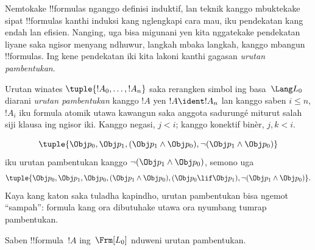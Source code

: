 \documentclass[../../../include/open-logic-section]{subfiles}
\begin{document}


Nemtokake !!{formula}s nganggo definisi induktif, lan teknik kanggo
mbuktekake sipat !!{formula}s kanthi induksi kang nglengkapi cara mau,
iku pendekatan kang endah lan efisien. Nanging, uga bisa migunani yen
kita nggatekake pendekatan liyane saka ngisor menyang ndhuwur, langkah
mbaka langkah, kanggo mbangun !!{formula}s. Ing kene pendekatan iki kita
lakoni kanthi gagasan \emph{urutan pambentukan}.

\begin{defn}
Urutan winates $\tuple{!A_0,\dotsc,!A_n}$ saka rerangken simbol ing
basa~$\Lang L_0$ diarani \emph{urutan pambentukan} kanggo $!A$ yen
$!A \ident !A_n$ lan kanggo saben $i \leq n$, $!A_i$ iku formula
atomik utawa kawangun saka anggota sadurungé miturut salah siji
klausa ing ngisor iki. Kanggo negasi, $j<i$; kanggo konektif binèr, $j,k<i$.
\begin{enumerate}
\end{enumerate}
\end{defn}

\begin{ex}
\[
\tuple{
    \Obj p_0,
    \Obj p_1,
    (\Obj p_1 \land \Obj p_0),
    \lnot (\Obj p_1 \land \Obj p_0)
}
\]
iku urutan pambentukan kanggo
$\lnot (\Obj p_1 \land \Obj p_0)$, semono uga
\[
\tuple{
    \Obj p_0,
    \Obj p_1,
    \Obj p_0,
    (\Obj p_1 \land \Obj p_0),
    (\Obj p_0 \lif \Obj p_1),
    \lnot (\Obj p_1 \land \Obj p_0)
}.
\]
%
Kaya kang katon saka tuladha kapindho, urutan pambentukan bisa ngemot
``sampah'': formula kang ora dibutuhake utawa ora nyumbang tumrap
pambentukan.
\end{ex}

\begin{prop}
Saben !!{formula}~$!A$ ing~$\Frm[L_0]$ nduweni urutan pambentukan.
\end{prop}
\end{document}
